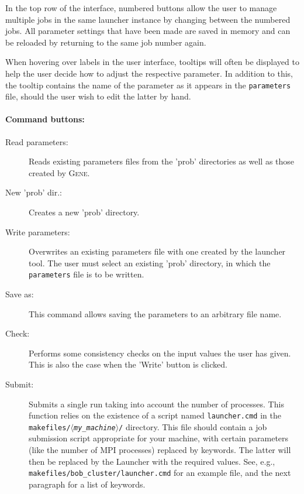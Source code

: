 \documentclass[12pt]{article}
\newcommand{\mach}{$\langle$\textsl{my\_machine}$\rangle$}
\begin{document}
In the top row of the interface, numbered buttons allow the user to manage multiple jobs in 
the same launcher instance by changing between the numbered jobs. All parameter settings that 
have been made are saved in memory and can be reloaded by returning to the same job number again. 

When hovering over labels in the user interface, tooltips will often be displayed to help the user 
decide how to adjust the respective parameter. In addition to this, the tooltip contains the 
name of the parameter as it appears in the \texttt{parameters} file, should the user wish to 
edit the latter by hand.

\paragraph{Command buttons:}
\begin{description}
\item[Read parameters:] Reads existing parameters files from the 'prob' directories as well as those 
created by \textsc{Gene}.
\item[New 'prob' dir.:] Creates a new 'prob' directory.
\item[Write parameters:] Overwrites an existing parameters file with one created by the launcher tool. 
  The user must select an existing 'prob' directory, in which the \texttt{parameters} file is to be written.
\item[Save as:] This command allows saving the parameters to an arbitrary file name.
\item[Check:] Performs some consistency checks on the input values the user has given. This is also the
case when the 'Write' button is clicked.
\item[Submit:] Submits a single run taking into account the number of processes. This function relies on 
the existence of a script named \texttt{launcher.cmd} in the \texttt{makefiles/\mach/} directory. This 
file should contain a job submission script appropriate for your machine, with certain parameters (like 
the number of MPI processes) replaced by keywords. The latter will then be replaced by the Launcher with 
the required values. See, e.g., \texttt{makefiles/bob\_cluster/launcher.cmd} for an example file, and 
the next paragraph for a list of keywords.
\end{description}
\end{document}
